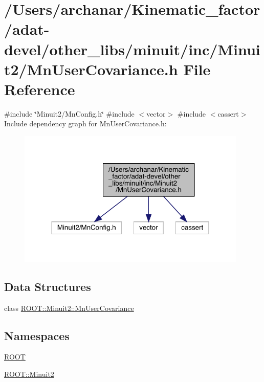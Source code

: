 \hypertarget{adat-devel_2other__libs_2minuit_2inc_2Minuit2_2MnUserCovariance_8h}{}\section{/\+Users/archanar/\+Kinematic\+\_\+factor/adat-\/devel/other\+\_\+libs/minuit/inc/\+Minuit2/\+Mn\+User\+Covariance.h File Reference}
\label{adat-devel_2other__libs_2minuit_2inc_2Minuit2_2MnUserCovariance_8h}
{\ttfamily \#include \char`\"{}Minuit2/\+Mn\+Config.\+h\char`\"{}}\newline
{\ttfamily \#include $<$vector$>$}\newline
{\ttfamily \#include $<$cassert$>$}\newline
Include dependency graph for Mn\+User\+Covariance.\+h\+:
\nopagebreak
\begin{figure}[H]
\begin{center}
\leavevmode
\includegraphics[width=310pt]{d6/d21/adat-devel_2other__libs_2minuit_2inc_2Minuit2_2MnUserCovariance_8h__incl}
\end{center}
\end{figure}
\subsection*{Data Structures}
\begin{DoxyCompactItemize}
\item 
class \mbox{\hyperlink{classROOT_1_1Minuit2_1_1MnUserCovariance}{R\+O\+O\+T\+::\+Minuit2\+::\+Mn\+User\+Covariance}}
\end{DoxyCompactItemize}
\subsection*{Namespaces}
\begin{DoxyCompactItemize}
\item 
 \mbox{\hyperlink{namespaceROOT}{R\+O\+OT}}
\item 
 \mbox{\hyperlink{namespaceROOT_1_1Minuit2}{R\+O\+O\+T\+::\+Minuit2}}
\end{DoxyCompactItemize}

